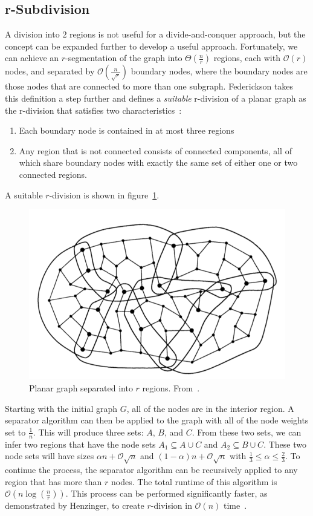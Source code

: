 \documentclass[11pt]{article}
\begin{document}
\subsection{r-Subdivision}
\label{sec:graph-sep-rsub}

A division into $2$ regions is not useful for a divide-and-conquer approach, but the concept can be expanded further to develop a useful approach. Fortunately, we can achieve an $r$-segmentation of the graph into $\Theta \left (\frac{n}{r} \right )$ regions, each with $\mathcal{O}(r)$ nodes, and separated by $\mathcal{O} \left (\frac{n}{\sqrt{r}} \right )$ boundary nodes, where the boundary nodes are those nodes that are connected to more than one subgraph. Federickson takes this definition a step further and defines a \textit{suitable} r-division of a planar graph as the r-division that satisfies two characteristics~\cite{federickson1987fast}:
\begin{enumerate}
    \item Each boundary node is contained in at most three regions

    \item Any region that is not connected consists of connected components, all of which share boundary nodes with exactly the same set of either one or two connected regions.
\end{enumerate}
A suitable $r$-division is shown in figure~\ref{fig:rsep}.

\begin{figure}[!htb]
    \centering
    \includegraphics[width=.5\textwidth]{rsep}
    \caption{Planar graph separated into $r$ regions. From~\cite{federickson1987fast}.}
    \label{fig:rsep}
\end{figure}

Starting with the initial graph $G$, all of the nodes are in the interior region. A separator algorithm can then be applied to the graph with all of the node weights set to $\frac{1}{n}$. This will produce three sets: $A$, $B$, and $C$. From these two sets, we can infer two regions that have the node sets $A_1 \subseteq A \cup C$ and $A_2 \subseteq B \cup C$. These two node sets will have sizes $\alpha n + \mathcal{O}\sqrt{n}$ and $(1 - \alpha) n + \mathcal{O}\sqrt{n}$ with $\frac{1}{3} \leq \alpha \leq \frac{2}{3}$. To continue the process, the separator algorithm can be recursively applied to any region that has more than $r$ nodes. The total runtime of this algorithm is $\mathcal{O} \left (n \log \left (\frac{n}{r} \right ) \right )$. This process can be performed significantly faster, as demonstrated by Henzinger, to create $r$-division in $\mathcal{O}(n)$ time~\cite{henzinger1997faster}.
\end{document}
